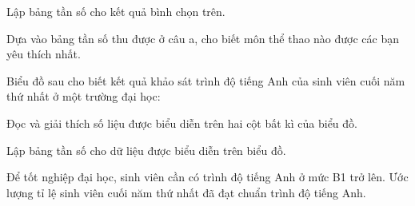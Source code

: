 \begin{practice}
\begin{questions}[series=SBT]
        \begin{questions}
            \item Lập bảng tần số cho kết quả bình chọn trên.

            \answerline
            \answerline

            \item Dựa vào bảng tần số thu được ở câu a, cho biết môn thể thao nào được các bạn yêu thích nhất.

            \answerline
        \end{questions}

        \item Biểu đồ sau cho biết kết quả khảo sát trình độ tiếng Anh của sinh viên cuối năm thứ nhất ở một trường đại học:

        \begin{center}
        \end{center}

        \begin{questions}
            \item Đọc và giải thích số liệu được biểu diễn trên hai cột bất kì của biểu đồ.

            \answerline

            \item Lập bảng tần số cho dữ liệu được biểu diễn trên biểu đồ.

            \answerline
            \answerline

            \item Để tốt nghiệp đại học, sinh viên cần có trình độ tiếng Anh ở mức B1 trở lên. Ước lượng tỉ lệ sinh viên cuối năm thứ nhất đã đạt chuẩn trình độ tiếng Anh.


\end{questions}
\end{questions}
\end{practice}
